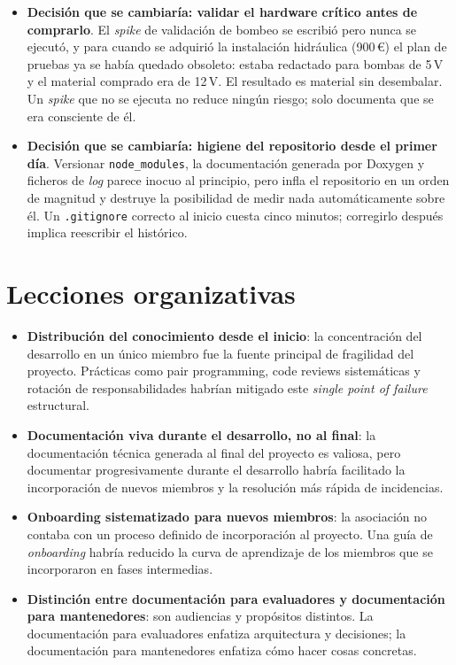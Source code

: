 \begin{itemize}[leftmargin=*]
    \item \textbf{Decisi\'on que se cambiar\'ia: validar el hardware
    cr\'itico antes de comprarlo}. El \textit{spike} de validaci\'on de
    bombeo se escribi\'o pero nunca se ejecut\'o, y para cuando se
    adquiri\'o la instalaci\'on hidr\'aulica (900\,\euro) el plan de
    pruebas ya se hab\'ia quedado obsoleto: estaba redactado para bombas
    de 5\,V y el material comprado era de 12\,V. El resultado es material
    sin desembalar. Un \textit{spike} que no se ejecuta no reduce ning\'un
    riesgo; solo documenta que se era consciente de \'el.

    \item \textbf{Decisi\'on que se cambiar\'ia: higiene del repositorio
    desde el primer d\'ia}. Versionar \texttt{node\_modules}, la
    documentaci\'on generada por Doxygen y ficheros de \textit{log}
    parece inocuo al principio, pero infla el repositorio en un orden de
    magnitud y destruye la posibilidad de medir nada autom\'aticamente
    sobre \'el. Un \texttt{.gitignore} correcto al inicio cuesta cinco
    minutos; corregirlo despu\'es implica reescribir el hist\'orico.
\end{itemize}

\section{Lecciones organizativas}

\begin{itemize}[leftmargin=*]
    \item \textbf{Distribuci\'on del conocimiento desde el inicio}: la
    concentraci\'on del desarrollo en un \'unico miembro fue la fuente
    principal de fragilidad del proyecto. Pr\'acticas como pair
    programming, code reviews sistem\'aticas y rotaci\'on de
    responsabilidades habr\'ian mitigado este \textit{single point of
    failure} estructural.

    \item \textbf{Documentaci\'on viva durante el desarrollo, no al
    final}: la documentaci\'on t\'ecnica generada al final del proyecto
    es valiosa, pero documentar progresivamente durante el desarrollo
    habr\'ia facilitado la incorporaci\'on de nuevos miembros y la
    resoluci\'on m\'as r\'apida de incidencias.

    \item \textbf{Onboarding sistematizado para nuevos miembros}: la
    asociaci\'on no contaba con un proceso definido de incorporaci\'on
    al proyecto. Una gu\'ia de \textit{onboarding} habr\'ia reducido la
    curva de aprendizaje de los miembros que se incorporaron en fases
    intermedias.

    \item \textbf{Distinci\'on entre documentaci\'on para evaluadores y
    documentaci\'on para mantenedores}: son audiencias y prop\'ositos
    distintos. La documentaci\'on para evaluadores enfatiza
    arquitectura y decisiones; la documentaci\'on para mantenedores
    enfatiza c\'omo hacer cosas concretas.
\end{itemize}

